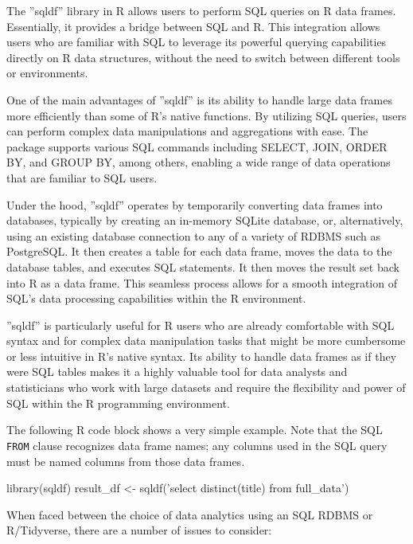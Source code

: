 The ''sqldf'' library in R allows users to perform SQL queries on R data frames. Essentially, it provides a bridge between SQL and R. This integration allows users who are familiar with SQL to leverage its powerful querying capabilities directly on R data structures, without the need to switch between different tools or environments.

One of the main advantages of ''sqldf'' is its ability to handle large data frames more efficiently than some of R's native functions. By utilizing SQL queries, users can perform complex data manipulations and aggregations with ease. The package supports various SQL commands including SELECT, JOIN, ORDER BY, and GROUP BY, among others, enabling a wide range of data operations that are familiar to SQL users.

Under the hood, ''sqldf'' operates by temporarily converting data frames into databases, typically by creating an in-memory SQLite database, or, alternatively, using an existing database connection to any of a variety of RDBMS such as PostgreSQL. It then creates a table for each data frame, moves the data to the database tables, and executes SQL statements. It then moves the result set back into R as a data frame. This seamless process allows for a smooth integration of SQL's data processing capabilities within the R environment.

''sqldf'' is particularly useful for R users who are already comfortable with SQL syntax and for complex data manipulation tasks that might be more cumbersome or less intuitive in R's native syntax. Its ability to handle data frames as if they were SQL tables makes it a highly valuable tool for data analysts and statisticians who work with large datasets and require the flexibility and power of SQL within the R programming environment.

The following R code block shows a very simple example. Note that the SQL \texttt{FROM} clause recognizes data frame names; any columns used in the SQL query must be named columns from those data frames.

\begin{Rcode}
library(sqldf)
result_df <- sqldf('select distinct(title) from full_data')
\end{Rcode}

When faced between the choice of data analytics using an SQL RDBMS or R/Tidyverse, there are a number of issues to consider:

